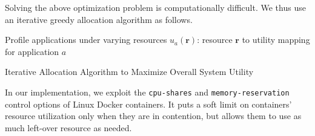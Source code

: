 Solving the above optimization problem is computationally difficult. We thus use an
iterative greedy allocation algorithm as follows.

\begin{algorithm}[H]
\SetAlgoLined
 Profile applications under varying resources\;
 $u_a(\mathbf{r})$: resource $\mathbf{r}$ to utility mapping for application
 $a$\;
 \caption{Iterative Allocation Algorithm to Maximize Overall System Utility}
\end{algorithm}


In our implementation, we exploit the \texttt{cpu-shares} and
\texttt{memory-reservation} control options of Linux Docker containers. It puts
a soft limit on containers' resource utilization only when they are in
contention, but allows them to use as much left-over resource as needed.